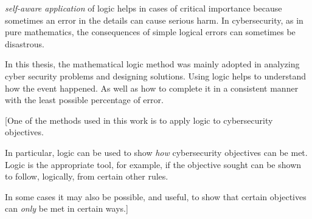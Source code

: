 {\em self-aware application} of logic helps in cases of critical importance because sometimes an error in the details can cause serious harm. In cybersecurity, as in pure mathematics, the consequences of simple logical errors can sometimes be disastrous.

In this thesis, the mathematical logic method was mainly adopted in analyzing cyber security problems and designing solutions. Using logic helps to understand how the event happened. As well as how to complete it in a consistent manner with the least possible percentage of error.
\iffalse
This extra step of {\em self-aware application} of logic is not always necessary but helps in cases of critical importance, where getting details wrong can sometimes cause serious harm. In cybersecurity, as in pure mathematics, the consequences of minor logical mistakes can sometimes be disastrous. 

This is why, in this dessertation, {\em mathematical} logic is regarded as the key scientific method which we employ to analyse cybersecurity problems, and in the design of cybersecurity solutions.
\if
This is not meant to suggest that mathematical logic should be used on a regular basis by cybersecurity professionals. Many cybersecurity professionals will never use it, and currently, many may not even have heard ot it. However, {\em logic} is used by all cybersecurity professionals on a regular basis. In the course of understanding how this takes place, and how it is done consistently and correctly, with as little chance of error as possible, we need to develop the sort of self-awareness, of what we are doing, that is best characerised, and explained, in the particular form of logic known as mathematical logic.\index{logic!mathematical}
\fi
[One of the methods used in this work is to apply logic to cybersecurity objectives. 

In particular, logic can be used to show {\em how} cybersecurity objectives can
be met. Logic is the appropriate tool, for example, if the objective sought can
be shown to follow, logically, from certain other rules.

In some cases it may also be possible, and useful, to show that certain objectives can {\em only}
be met in certain ways.]

\fi



